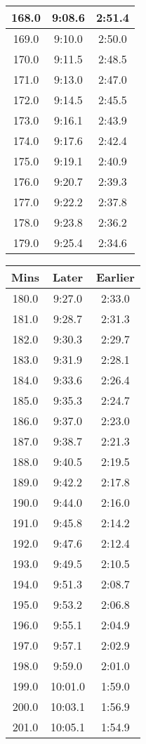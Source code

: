 \begin{footnotesize}
\begin{minipage}{0.25\textwidth}
\begin{tabular}[t]{c|c|c}
	168.0&9:08.6&2:51.4\\\hline
	169.0&9:10.0&2:50.0\\\hline
	170.0&9:11.5&2:48.5\\\hline
	171.0&9:13.0&2:47.0\\\hline
	172.0&9:14.5&2:45.5\\\hline
	173.0&9:16.1&2:43.9\\\hline
	174.0&9:17.6&2:42.4\\\hline
	175.0&9:19.1&2:40.9\\\hline
	176.0&9:20.7&2:39.3\\\hline
	177.0&9:22.2&2:37.8\\\hline
	178.0&9:23.8&2:36.2\\\hline
	179.0&9:25.4&2:34.6\\\hline
		\end{tabular}\end{minipage}
\begin{minipage}{0.25\textwidth}\begin{tabular}[t]{c|c|c}
			Mins&Later&Earlier\\\hline
	180.0&9:27.0&2:33.0\\\hline
	181.0&9:28.7&2:31.3\\\hline
	182.0&9:30.3&2:29.7\\\hline
	183.0&9:31.9&2:28.1\\\hline
	184.0&9:33.6&2:26.4\\\hline
	185.0&9:35.3&2:24.7\\\hline
	186.0&9:37.0&2:23.0\\\hline
	187.0&9:38.7&2:21.3\\\hline
	188.0&9:40.5&2:19.5\\\hline
	189.0&9:42.2&2:17.8\\\hline
	190.0&9:44.0&2:16.0\\\hline
	191.0&9:45.8&2:14.2\\\hline
	192.0&9:47.6&2:12.4\\\hline
	193.0&9:49.5&2:10.5\\\hline
	194.0&9:51.3&2:08.7\\\hline
	195.0&9:53.2&2:06.8\\\hline
	196.0&9:55.1&2:04.9\\\hline
	197.0&9:57.1&2:02.9\\\hline
	198.0&9:59.0&2:01.0\\\hline
	199.0&10:01.0&1:59.0\\\hline
	200.0&10:03.1&1:56.9\\\hline
	201.0&10:05.1&1:54.9\\\hline

\end{tabular}
\end{minipage}
\end{footnotesize}
